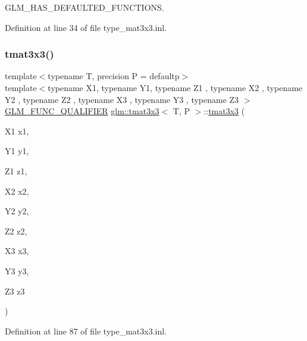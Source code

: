 G\+L\+M\+\_\+\+H\+A\+S\+\_\+\+D\+E\+F\+A\+U\+L\+T\+E\+D\+\_\+\+F\+U\+N\+C\+T\+I\+O\+NS. 



Definition at line 34 of file type\+\_\+mat3x3.\+inl.

\mbox{\label{structglm_1_1tmat3x3_ad8e35f18c7065afeec8ddca4f7497a26}} 
\subsubsection{\texorpdfstring{tmat3x3()}{tmat3x3()}\hspace{0.1cm}{\footnotesize\ttfamily [20/22]}}
{\footnotesize\ttfamily template$<$typename T, precision P = defaultp$>$ \\
template$<$typename X1, typename Y1, typename Z1 , typename X2 , typename Y2 , typename Z2 , typename X3 , typename Y3 , typename Z3 $>$ \\
\mbox{\hyperlink{setup_8hpp_a33fdea6f91c5f834105f7415e2a64407}{G\+L\+M\+\_\+\+F\+U\+N\+C\+\_\+\+Q\+U\+A\+L\+I\+F\+I\+ER}} \mbox{\hyperlink{structglm_1_1tmat3x3}{glm\+::tmat3x3}}$<$ T, P $>$\+::\mbox{\hyperlink{structglm_1_1tmat3x3}{tmat3x3}} (\begin{DoxyParamCaption}\item[{X1}]{x1,  }\item[{Y1}]{y1,  }\item[{Z1}]{z1,  }\item[{X2}]{x2,  }\item[{Y2}]{y2,  }\item[{Z2}]{z2,  }\item[{X3}]{x3,  }\item[{Y3}]{y3,  }\item[{Z3}]{z3 }\end{DoxyParamCaption})}



Definition at line 87 of file type\+\_\+mat3x3.\+inl.

\mbox{\label{structglm_1_1tmat3x3_a065a41b6dbbc35bc4785e7f429359a2f}} 
